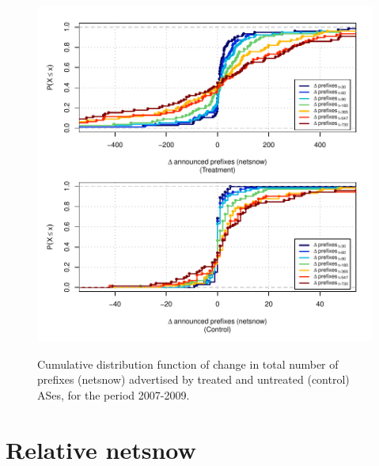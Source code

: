 \clearpage
\vspace*{1.25em}
\begin{figure}[H]
\begin{centering}
\begin{singlespace}
\captionsetup{list=no}
    \includegraphics[width=6in]{figures/behavior-netsnow-2007_2009-corr.pdf}
    \vspace{-2em}\\
    \caption{Cumulative distribution function of change in total number of
    prefixes (netsnow) advertised by treated and untreated (control) ASes, for
    the period 2007-2009.}
\end{singlespace}
\end{centering}
\end{figure}


\clearpage
\section{Relative netsnow}

